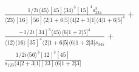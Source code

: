 \documentclass[varwidth, border=5pt]{standalone}
\begin{document}
\begin{my}
$\begin{gathered}
\scriptscriptstyle\frac{1/2i⟨45⟩[45]⟨34⟩^3[15]^4s_{234}^3}{⟨23⟩[16][56]⟨2|1+6|5]⟨4|2+3|1]⟨4|1+6|5]^4}+\\
\scriptscriptstyle\frac{-1/2i[34]^3⟨45⟩⟨6|1+2|5]^4}{⟨12⟩⟨16⟩[35]^4⟨2|1+6|5]⟨6|1+2|3]s_{345}}+\\
\scriptscriptstyle\frac{1/2i⟨56⟩^3[12]^3[45]}{s_{123}⟨4|2+3|1][23]⟨6|1+2|3]}\phantom{+}
\end{gathered}$
\end{my}
\end{document}
